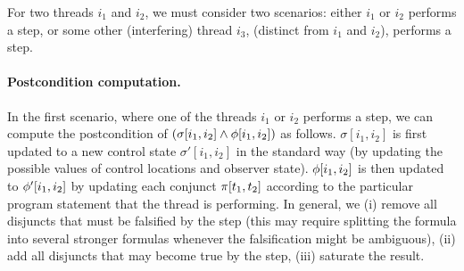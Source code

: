 

For two threads $i_1$ and $i_2$, we must consider two
scenarios: either $i_1$ or $i_2$ %
performs a step, or some other
(interfering) thread $i_3$, (distinct from $i_1$ and $i_2$), performs
a step.

\paragraph{Postcondition computation.}
In the first scenario, where one of the threads $i_1$ or $i_2$
performs a step, we can compute the postcondition of %
\(%
\left( \symbstate[i_1,i_2] \land \shapeconstr[i_1,i_2] \right)%
\) %
as follows. %
$\sigma[i_1,i_2]$ is first updated to a new control state
$\sigma'[i_1,i_2]$ in the standard way (by updating the possible
values of control locations and observer state). %
$\phi[i_1,i_2]$ is then updated to $\phi'[i_1,i_2]$ by
updating each conjunct $\pi[t_1,t_2]$ according to the
particular program statement that the thread is performing. %
In general, we (i) remove all disjuncts that must be falsified by the
step %
(this may require splitting the formula into several stronger formulas
whenever the falsification might be ambiguous), %
(ii) add all disjuncts that may become true by the step, %
(iii) saturate the result. %

